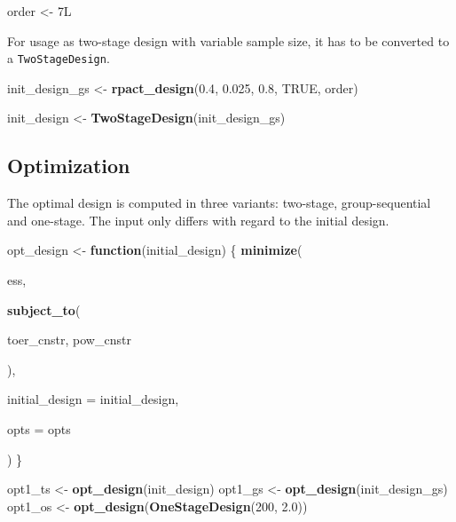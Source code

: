 \documentclass[]{book}
\newenvironment{Shaded}{\begin{snugshade}}{\end{snugshade}}
\newcommand{\ControlFlowTok}[1]{\textcolor[rgb]{0.13,0.29,0.53}{\textbf{#1}}}
\newcommand{\DataTypeTok}[1]{\textcolor[rgb]{0.13,0.29,0.53}{#1}}
\newcommand{\DecValTok}[1]{\textcolor[rgb]{0.00,0.00,0.81}{#1}}
\newcommand{\FloatTok}[1]{\textcolor[rgb]{0.00,0.00,0.81}{#1}}
\newcommand{\KeywordTok}[1]{\textcolor[rgb]{0.13,0.29,0.53}{\textbf{#1}}}
\newcommand{\NormalTok}[1]{#1}
\newcommand{\OtherTok}[1]{\textcolor[rgb]{0.56,0.35,0.01}{#1}}
\newcommand{\StringTok}[1]{\textcolor[rgb]{0.31,0.60,0.02}{#1}}
\begin{document}
\begin{Shaded}
\begin{Highlighting}[]
\NormalTok{order <-}\StringTok{ }\NormalTok{7L}
\end{Highlighting}
\end{Shaded}

For usage as two-stage design with variable sample size, it has to
be converted to a \texttt{TwoStageDesign}.

\begin{Shaded}
\begin{Highlighting}[]
\NormalTok{init_design_gs <-}\StringTok{ }\KeywordTok{rpact_design}\NormalTok{(}\FloatTok{0.4}\NormalTok{, }\FloatTok{0.025}\NormalTok{, }\FloatTok{0.8}\NormalTok{, }\OtherTok{TRUE}\NormalTok{, order)}

\NormalTok{init_design    <-}\StringTok{ }\KeywordTok{TwoStageDesign}\NormalTok{(init_design_gs)}
\end{Highlighting}
\end{Shaded}

\hypertarget{optimization}{%
\subsection{Optimization}\label{optimization}}

The optimal design is computed in three variants: two-stage, group-sequential
and one-stage.
The input only differs with regard to the initial design.

\begin{Shaded}
\begin{Highlighting}[]
\NormalTok{opt_design <-}\StringTok{ }\ControlFlowTok{function}\NormalTok{(initial_design) \{}
    \KeywordTok{minimize}\NormalTok{(}
        
\NormalTok{        ess,}
        
        \KeywordTok{subject_to}\NormalTok{(}
            
\NormalTok{            toer_cnstr,}
\NormalTok{            pow_cnstr}
            
\NormalTok{        ),}
        
        \DataTypeTok{initial_design =}\NormalTok{ initial_design,}
        
        \DataTypeTok{opts =}\NormalTok{ opts}
        
\NormalTok{    )}
\NormalTok{\}}

\NormalTok{opt1_ts <-}\StringTok{ }\KeywordTok{opt_design}\NormalTok{(init_design)}
\NormalTok{opt1_gs <-}\StringTok{ }\KeywordTok{opt_design}\NormalTok{(init_design_gs)}
\NormalTok{opt1_os <-}\StringTok{ }\KeywordTok{opt_design}\NormalTok{(}\KeywordTok{OneStageDesign}\NormalTok{(}\DecValTok{200}\NormalTok{, }\FloatTok{2.0}\NormalTok{))}
\end{Highlighting}
\end{Shaded}
\end{document}
